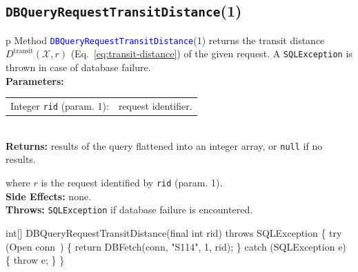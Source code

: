 \subsection{\texttt{DBQueryRequestTransitDistance}(1)}
\begin{tabular}{p{\textwidth}}
\toprule
{}
Method \textcolor{blue}{{\tt{}\protect{}DBQueryRequestTransitDistance}}(1) returns the
transit distance $D^\textrm{transit}(\mathcal{X},r)$
(Eq.~\ref{eq:transit-distance}) of the given request.
A {\tt{}SQLException} is thrown in case of database failure.\\
\midrule
\textbf{Parameters:}\\
\begin{tabular}{lp{116mm}}
Integer {\tt{}rid} (param. 1):&request identifier.
\end{tabular}\\
\textbf{Returns:} results of the query flattened into an integer array,
or {\tt{}null} if no results.


where $r$ is the request identified by {\tt{}rid} (param. 1).\\
\textbf{Side Effects:} none.\\
\textbf{Throws:} {\tt{}SQLException} if database failure is encountered.\\
\bottomrule
\end{tabular}
\nwenddocs{}\endmoddef{}
int[] DBQueryRequestTransitDistance(final int rid) throws SQLException \{
  try (\LA{}Open \code{}conn\edoc{}~{\nwtagstyle{}}\RA{}) \{
    return DBFetch(conn, "S114", 1, rid);
  \} catch (SQLException e) \{
    throw e;
  \}
\}
\eatline
{}\nwendcode{}\nwdocspar
